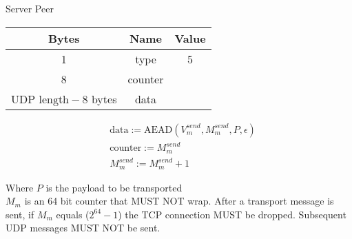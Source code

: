 \begin{center}
    Server \textrightarrow Peer\\
    \begin{tabular}{|c|c|c|}
        \hline
        \textbf{Bytes}                & \textbf{Name} & \textbf{Value} \\
        \hline
        1                             & type          & 5              \\
        \hline
        8                             & counter       &                \\
        \hline
        $\text{UDP length} - 8$ bytes & data          &                \\
        \hline
    \end{tabular}
\end{center}


\begin{align*}
    & \text{data} := \text{AEAD}(V_{m}^{send}, M_{m}^{send}, P, \epsilon)\\
    & \text{counter} := M_{m}^{send}\\
    & M_{m}^{send} := M_{m}^{send} + 1
\end{align*}


Where $P$ is the payload to be transported\\

$M_{m}$ is an 64 bit counter that MUST NOT wrap. After a transport message is sent, if $M_{m}$ equals
($2^{64}-1$) the TCP connection MUST be dropped. Subsequent UDP messages MUST NOT be sent. \\

